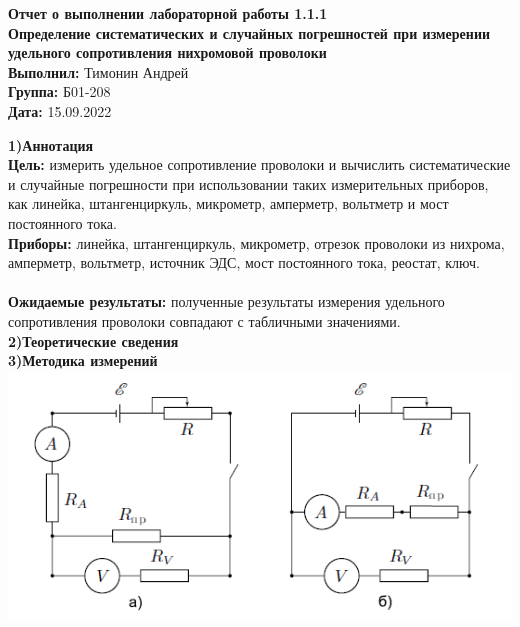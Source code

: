 \documentclass[a4paper, 12pt]{article}
\begin{document}
	\begin{Huge}
		\begin{center}
			\textbf{Отчет о выполнении лабораторной работы 1.1.1}\\
			\vspace{2em}
			\textbf{Определение систематических и случайных погрешностей при измерении удельного сопротивления нихромовой проволоки}\\
			\vspace{5em}
			\textbf{Выполнил: }Тимонин Андрей\\
			\textbf{Группа: }Б01-208\\
			\vspace{6em}
			\textbf{Дата: }15.09.2022\\
		\end{center}
	\end{Huge}
\textbf{1)Аннотация}\\
\textbf{Цель: }
измерить удельное сопротивление проволоки и вычислить систематические и случайные погрешности при использовании таких измерительных приборов, как линейка, штангенциркуль, микрометр, амперметр, вольтметр и мост постоянного тока. 
\vspace{1em}\\\textbf{Приборы: }
линейка, штангенциркуль, микрометр, отрезок проволоки из нихрома, амперметр, вольтметр, источник ЭДС, мост постоянного тока, реостат, ключ.\\ 
\vspace{1em}\\\textbf{Ожидаемые результаты:}
полученные результаты измерения удельного сопротивления проволоки совпадают с табличными значениями.\vspace{2em}
\vspace{2em}\textbf{2)Теоретические сведения}\\
\vspace{2em}\textbf{3)Методика измерений}\\
\includegraphics{1.png}\\
\end{document}
